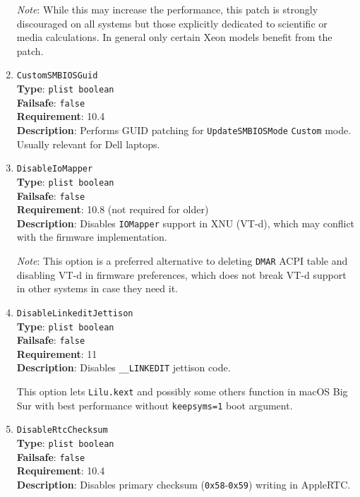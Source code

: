 \documentclass[]{article}
\begin{document}
\begin{enumerate}
  \emph{Note}: While this may increase the performance, this patch is strongly discouraged
  on all systems but those explicitly dedicated to scientific or media calculations.
  In general only certain Xeon models benefit from the patch.

\item
  \texttt{CustomSMBIOSGuid}\\
  \textbf{Type}: \texttt{plist\ boolean}\\
  \textbf{Failsafe}: \texttt{false}\\
  \textbf{Requirement}: 10.4\\
  \textbf{Description}: Performs GUID patching for \texttt{UpdateSMBIOSMode}
  \texttt{Custom} mode. Usually relevant for Dell laptops.

\item
  \texttt{DisableIoMapper}\\
  \textbf{Type}: \texttt{plist\ boolean}\\
  \textbf{Failsafe}: \texttt{false}\\
  \textbf{Requirement}: 10.8 (not required for older)\\
  \textbf{Description}: Disables \texttt{IOMapper} support in XNU (VT-d),
  which may conflict with the firmware implementation.

  \emph{Note}: This option is a preferred alternative to deleting \texttt{DMAR}
  ACPI table and disabling VT-d in firmware preferences, which does not break
  VT-d support in other systems in case they need it.

\item
  \texttt{DisableLinkeditJettison}\\
  \textbf{Type}: \texttt{plist\ boolean}\\
  \textbf{Failsafe}: \texttt{false}\\
  \textbf{Requirement}: 11\\
  \textbf{Description}: Disables \texttt{\_\_LINKEDIT} jettison code.

  This option lets \texttt{Lilu.kext} and possibly some others function
  in macOS Big Sur with best performance without \texttt{keepsyms=1}
  boot argument.

\item
  \texttt{DisableRtcChecksum}\\
  \textbf{Type}: \texttt{plist\ boolean}\\
  \textbf{Failsafe}: \texttt{false}\\
  \textbf{Requirement}: 10.4\\
  \textbf{Description}: Disables primary checksum (\texttt{0x58}-\texttt{0x59})
  writing in AppleRTC.


\end{enumerate}
\end{document}

